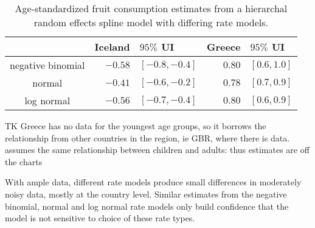     \begin{table}[h]
        \begin{center}
        \begin{tabular}{|c|rl|rl|}
            \hline
                & Iceland&$95\%$ UI & Greece&$95\%$ UI \\
            \hline
                negative binomial & $-0.58$&$ [-0.8, -0.4]$ & $0.80$&$ [0.6, 1.0]$ \\
                normal & $-0.41$&$ [-0.6, -0.2]$ & $0.78$&$ [0.7, 0.9]$ \\
                log normal & $-0.56$& $[-0.7, -0.4]$ & $0.80$&$ [0.6, 0.9]$ \\
            \hline
        \end{tabular}
        \end{center}
        \caption{ Age-standardized fruit consumption estimates
          from a hierarchal random effects spline model with differing
          rate models.}
        \label{tab:app-fruit rfx}
    \end{table}

TK Greece has no data for the youngest age groups, so it borrows the relationship
from other countries in the region, ie GBR, where there is data.  assumes the 
same relationship between children and adults: thus estimates are off the charts


With ample data, different rate models produce small differences in
moderately noisy data, mostly at the country level.  Similar estimates
from the negative binomial, normal and log normal rate models only
build confidence that the model is not sensitive to choice of these
rate types.
